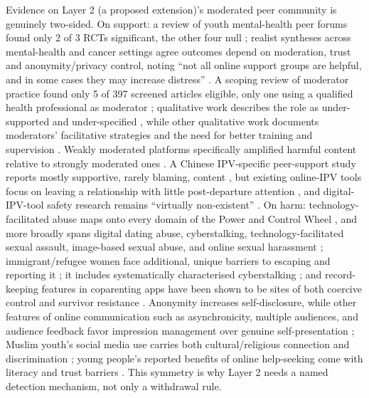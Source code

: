 \documentclass[11pt]{article}
\begin{document}
Evidence on Layer 2 (a proposed extension)'s moderated peer community is genuinely two-sided. On support: a review of youth mental-health peer forums found only 2 of 3 RCTs significant, the other four null \cite{ref139}; realist syntheses across mental-health and cancer settings agree outcomes depend on moderation, trust and anonymity/privacy control, noting ``not all online support groups are helpful, and in some cases they may increase distress'' \cite{ref140,ref141,ref146}. A scoping review of moderator practice found only 5 of 397 screened articles eligible, only one using a qualified health professional as moderator \cite{ref142}; qualitative work describes the role as under-supported and under-specified \cite{ref143}, while other qualitative work documents moderators' facilitative strategies and the need for better training and supervision \cite{ref144}. Weakly moderated platforms specifically amplified harmful content relative to strongly moderated ones \cite{ref145}. A Chinese IPV-specific peer-support study reports mostly supportive, rarely blaming, content \cite{ref147}, but existing online-IPV tools focus on leaving a relationship with little post-departure attention \cite{ref148}, and digital-IPV-tool safety research remains ``virtually non-existent'' \cite{ref137}. On harm: technology-facilitated abuse maps onto every domain of the Power and Control Wheel \cite{ref149}, and more broadly spans digital dating abuse, cyberstalking, technology-facilitated sexual assault, image-based sexual abuse, and online sexual harassment \cite{ref150}; immigrant/refugee women face additional, unique barriers to escaping and reporting it \cite{ref151}; it includes systematically characterised cyberstalking \cite{ref152}; and record-keeping features in coparenting apps have been shown to be sites of both coercive control and survivor resistance \cite{ref153}. Anonymity increases self-disclosure, while other features of online communication such as asynchronicity, multiple audiences, and audience feedback favor impression management over genuine self-presentation \cite{ref154}; Muslim youth's social media use carries both cultural/religious connection and discrimination \cite{ref157}; young people's reported benefits of online help-seeking come with literacy and trust barriers \cite{ref156}. This symmetry is why Layer 2 needs a named detection mechanism, not only a withdrawal rule.
\end{document}
